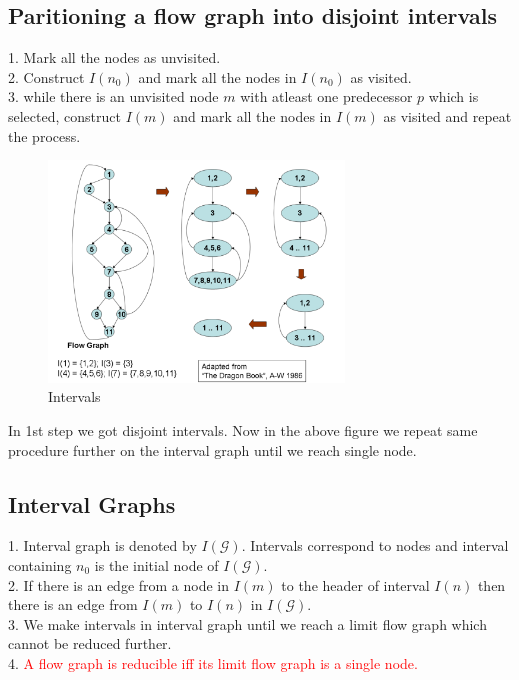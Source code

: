 \documentclass{article}
\begin{document}
\subsection*{Paritioning a flow graph into disjoint intervals}
1. Mark all the nodes as unvisited. \\
2. Construct $I(n_0)$ and mark all the nodes in $I(n_0)$ as visited. \\
3. while there is an unvisited node $m$ with atleast one predecessor $p$ which is selected, construct $I(m)$ and mark all the nodes in $I(m)$ as visited and repeat the process. 

\begin{figure}[h]
    \centering
    \includegraphics[width=0.7\textwidth]{Images/reducible2.png}
    \caption{Intervals}
    \label{fig:Reducibility}
\end{figure}

In 1st step we got disjoint intervals. Now in the above figure we repeat same procedure further on the interval graph until we reach single node.

\subsection*{Interval Graphs}
1. Interval graph is denoted by $I(\mathcal{G})$. Intervals correspond to nodes and interval containing $n_0$ is the initial node of $I(\mathcal{G})$. \\
2. If there is an edge from a node in $I(m)$ to the header of interval $I(n)$ then there is an edge from $I(m)$ to $I(n)$ in $I(\mathcal{G})$. \\
3. We make intervals in interval graph until we reach a limit flow graph which cannot be reduced further. \\
4. \textcolor{red}{A flow graph is reducible iff its limit flow graph is a single node.}
\end{document}
